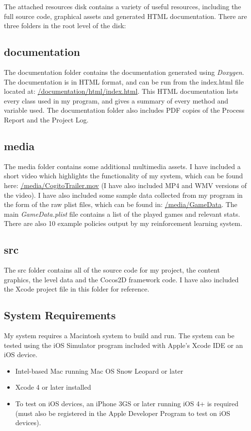 \documentclass[a4paper,oneside]{report}
\begin{document}
The attached resources disk contains a variety of useful resources, including the full source code, graphical assets and generated HTML documentation. There are three folders in the root level of the disk: 

\subsection{documentation} The documentation folder contains the documentation generated using \emph{Doxygen}. The documentation is in HTML format, and can be run from the index.html file located at: \url{/documentation/html/index.html}. This HTML documentation lists every class used in my program, and gives a summary of every method and variable used. The documentation folder also includes PDF copies of the Process Report and the Project Log.

\subsection{media} The media folder contains some additional multimedia assets. I have included a short video which highlights the functionality of my system, which can be found here: \url{/media/CogitoTrailer.mov} (I have also included MP4 and WMV versions of the video). I have also included some sample data collected from my program in the form of the raw plist files, which can be found in: \url{/media/GameData}. The main \emph{GameData.plist} file contains a list of the played games and relevant stats. There are also 10 example policies output by my reinforcement learning system. 

\subsection{src} The src folder contains all of the source code for my project, the content graphics, the level data and the Cocos2D framework code. I have also included the Xcode project file in this folder for reference.

\subsection{System Requirements}

My system requires a Macintosh system to build and run. The system can be tested using the iOS Simulator program included with Apple's Xcode IDE or an iOS device.

\begin{itemize}
	\item Intel-based Mac running Mac OS Snow Leopard or later
	\item Xcode 4 or later installed
	\item To test on iOS devices, an iPhone 3GS or later running iOS 4+ is required (must also be registered in the Apple Developer Program to test on iOS devices).
\end{itemize}



	
%
%

\singlespace

\newpage
{}


\end{document}
